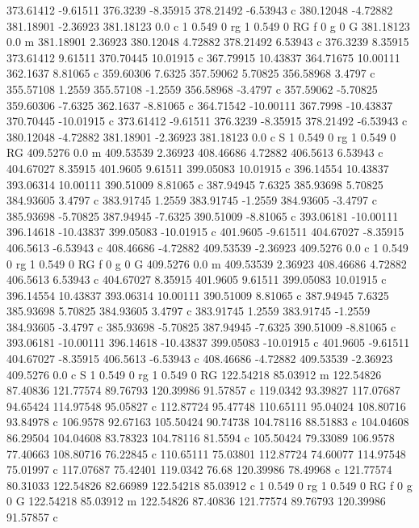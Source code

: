 373.61412 -9.61511 
376.3239 -8.35915 
378.21492 -6.53943 c 
380.12048 -4.72882 
381.18901 -2.36923 
381.18123 0.0 c 
1 0.549 0 rg 1 0.549 0 RG f 
0 g 0 G 
381.18123 0.0 m 
381.18901 2.36923 
380.12048 4.72882 
378.21492 6.53943 c 
376.3239 8.35915 
373.61412 9.61511 
370.70445 10.01915 c 
367.79915 10.43837 
364.71675 10.00111 
362.1637 8.81065 c 
359.60306 7.6325 
357.59062 5.70825 
356.58968 3.4797 c 
355.57108 1.2559 
355.57108 -1.2559 
356.58968 -3.4797 c 
357.59062 -5.70825 
359.60306 -7.6325 
362.1637 -8.81065 c 
364.71542 -10.00111 
367.7998 -10.43837 
370.70445 -10.01915 c 
373.61412 -9.61511 
376.3239 -8.35915 
378.21492 -6.53943 c 
380.12048 -4.72882 
381.18901 -2.36923 
381.18123 0.0 c 
S 
1 0.549 0 rg 1 0.549 0 RG 
409.5276 0.0 m 
409.53539 2.36923 
408.46686 4.72882 
406.5613 6.53943 c 
404.67027 8.35915 
401.9605 9.61511 
399.05083 10.01915 c 
396.14554 10.43837 
393.06314 10.00111 
390.51009 8.81065 c 
387.94945 7.6325 
385.93698 5.70825 
384.93605 3.4797 c 
383.91745 1.2559 
383.91745 -1.2559 
384.93605 -3.4797 c 
385.93698 -5.70825 
387.94945 -7.6325 
390.51009 -8.81065 c 
393.06181 -10.00111 
396.14618 -10.43837 
399.05083 -10.01915 c 
401.9605 -9.61511 
404.67027 -8.35915 
406.5613 -6.53943 c 
408.46686 -4.72882 
409.53539 -2.36923 
409.5276 0.0 c 
1 0.549 0 rg 1 0.549 0 RG f 
0 g 0 G 
409.5276 0.0 m 
409.53539 2.36923 
408.46686 4.72882 
406.5613 6.53943 c 
404.67027 8.35915 
401.9605 9.61511 
399.05083 10.01915 c 
396.14554 10.43837 
393.06314 10.00111 
390.51009 8.81065 c 
387.94945 7.6325 
385.93698 5.70825 
384.93605 3.4797 c 
383.91745 1.2559 
383.91745 -1.2559 
384.93605 -3.4797 c 
385.93698 -5.70825 
387.94945 -7.6325 
390.51009 -8.81065 c 
393.06181 -10.00111 
396.14618 -10.43837 
399.05083 -10.01915 c 
401.9605 -9.61511 
404.67027 -8.35915 
406.5613 -6.53943 c 
408.46686 -4.72882 
409.53539 -2.36923 
409.5276 0.0 c 
S 
1 0.549 0 rg 1 0.549 0 RG 
122.54218 85.03912 m 
122.54826 87.40836 
121.77574 89.76793 
120.39986 91.57857 c 
119.0342 93.39827 
117.07687 94.65424 
114.97548 95.05827 c 
112.87724 95.47748 
110.65111 95.04024 
108.80716 93.84978 c 
106.9578 92.67163 
105.50424 90.74738 
104.78116 88.51883 c 
104.04608 86.29504 
104.04608 83.78323 
104.78116 81.5594 c 
105.50424 79.33089 
106.9578 77.40663 
108.80716 76.22845 c 
110.65111 75.03801 
112.87724 74.60077 
114.97548 75.01997 c 
117.07687 75.42401 
119.0342 76.68 
120.39986 78.49968 c 
121.77574 80.31033 
122.54826 82.66989 
122.54218 85.03912 c 
1 0.549 0 rg 1 0.549 0 RG f 
0 g 0 G 
122.54218 85.03912 m 
122.54826 87.40836 
121.77574 89.76793 
120.39986 91.57857 c 
